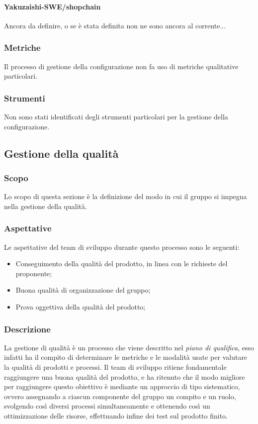         \paragraph{Yakuzaishi-SWE/shopchain}
        Ancora da definire, o se è stata definita non ne sono ancora al corrente...



    \subsubsection{Metriche}
    Il processo di gestione della configurazione non fa uso di metriche qualitative particolari.
    
    \subsubsection{Strumenti}
    Non sono stati identificati degli strumenti particolari per la gestione della configurazione.

\pagebreak

\subsection{Gestione della qualità}\label{subsection: gestione_qualita}
\subsubsection{Scopo}
Lo scopo di questa sezione è la definizione del modo in cui il gruppo si impegna nella gestione della qualità.
\subsubsection{Aspettative}
Le aspettative del team di sviluppo durante questo processo sono le seguenti:
\begin {itemize}
    \item Conseguimento della qualità del prodotto, in linea con le richieste del proponente;
    \item Buona qualità di organizzazione del gruppo;
    \item Prova oggettiva della qualità del prodotto;
\end {itemize}
\subsubsection{Descrizione}
La gestione di qualità è un processo che viene descritto nel \textit{piano di qualifica}, esso infatti ha il compito di determinare le metriche e le modalità usate per valutare la qualità di prodotti e processi.
Il team di sviluppo ritiene fondamentale raggiungere una buona qualità del prodotto, e ha ritenuto che il modo migliore per raggiungere questo obiettivo è mediante un approccio di tipo sistematico, ovvero assegnando a ciascun componente del gruppo un compito e un ruolo, svolgendo così diversi processi simultaneamente e ottenendo così un ottimizzazione delle risorse, effettuando infine dei test sul prodotto finito. 

